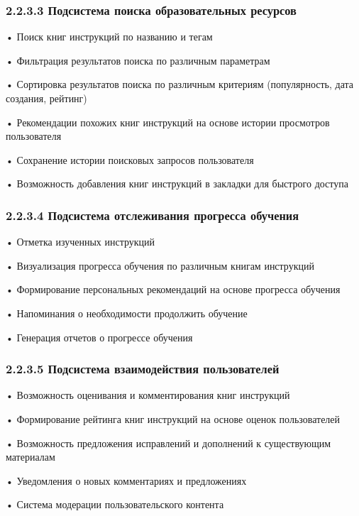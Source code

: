 {  \subsubsection*{2.2.3.3 Подсистема поиска образовательных ресурсов}

  \par \redline • Поиск книг инструкций по названию и тегам
  \par \redline • Фильтрация результатов поиска по различным параметрам
  \par \redline • Сортировка результатов поиска по различным критериям (популярность, дата создания, рейтинг)
  \par \redline • Рекомендации похожих книг инструкций на основе истории просмотров пользователя
  \par \redline • Сохранение истории поисковых запросов пользователя
  \par \redline • Возможность добавления книг инструкций в закладки для быстрого доступа

  \subsubsection*{2.2.3.4 Подсистема отслеживания прогресса обучения}

  \par \redline • Отметка изученных инструкций
  \par \redline • Визуализация прогресса обучения по различным книгам инструкций
  \par \redline • Формирование персональных рекомендаций на основе прогресса обучения
  \par \redline • Напоминания о необходимости продолжить обучение
  \par \redline • Генерация отчетов о прогрессе обучения

  \subsubsection*{2.2.3.5 Подсистема взаимодействия пользователей}

  \par \redline • Возможность оценивания и комментирования книг инструкций
  \par \redline • Формирование рейтинга книг инструкций на основе оценок пользователей
  \par \redline • Возможность предложения исправлений и дополнений к существующим материалам
  \par \redline • Уведомления о новых комментариях и предложениях
  \par \redline • Система модерации пользовательского контента

  \par
}

